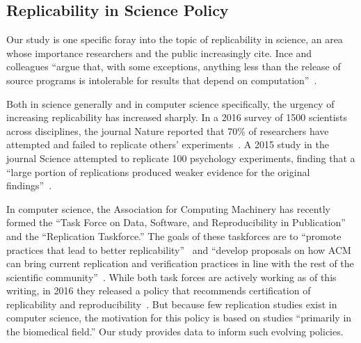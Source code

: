 \documentclass[10pt,conference]{IEEEtran}
\begin{document}

\subsection{Replicability in Science Policy}


Our study is one specific foray into the topic of replicability
in science, an area whose importance researchers and the public 
increasingly cite.
Ince and colleagues ``argue that, with some exceptions, anything less 
than the release of source programs is intolerable for 
results that depend on computation''~\cite{ince2012case}.

Both in science generally and in computer science specifically,
the urgency of increasing replicability has increased sharply.
In a 2016 survey of 1500 scientists across disciplines, the journal
Nature reported that 70\% of researchers have attempted
and failed to replicate others' experiments~\cite{baker20161}.
A 2015 study in the journal Science 
attempted to replicate 100 psychology experiments,
finding that a ``large portion of replications produced weaker evidence for the original findings''~\cite{open2015estimating}.

In computer science, the Association for Computing Machinery has
recently formed the ``Task Force on Data, Software, and Reproducibility in Publication''
and the ``Replication Taskforce.''
The goals of these taskforces are to 
``promote practices that lead to better replicability''~\cite{acmDataTaskforce} and 
``develop proposals on how ACM can bring current replication and 
verification practices in line with the rest of the scientific 
community''~\cite{acmRepTaskforce}.
While both task forces are actively working as of this writing, 
in 2016 they released a policy that recommends certification of
replicability and reproducibility~\cite{acmArtifactPolicy}.
But because few replication studies exist in computer science,
the motivation for this policy is based on studies
``primarily in the biomedical field.''
Our study provides data to inform such evolving policies.
\end{document}
